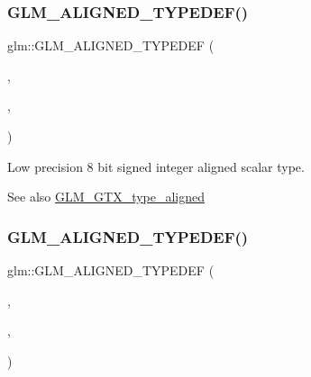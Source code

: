 \subsubsection{\texorpdfstring{G\+L\+M\+\_\+\+A\+L\+I\+G\+N\+E\+D\+\_\+\+T\+Y\+P\+E\+D\+E\+F()}{GLM\_ALIGNED\_TYPEDEF()}\hspace{0.1cm}{\footnotesize\ttfamily [1/209]}}
{\footnotesize\ttfamily glm\+::\+G\+L\+M\+\_\+\+A\+L\+I\+G\+N\+E\+D\+\_\+\+T\+Y\+P\+E\+D\+EF (\begin{DoxyParamCaption}\item[{\hyperlink{group__gtc__type__precision_gaf9e675b6392764242ae87eb179e9d3d6}{lowp\+\_\+int8}}]{,  }\item[{aligned\+\_\+lowp\+\_\+int8}]{,  }\item[{1}]{ }\end{DoxyParamCaption})}

Low precision 8 bit signed integer aligned scalar type. \begin{DoxySeeAlso}{See also}
\hyperlink{group__gtx__type__aligned}{G\+L\+M\+\_\+\+G\+T\+X\+\_\+type\+\_\+aligned} 
\end{DoxySeeAlso}
\mbox{\label{group__gtx__type__aligned_ga5bb5dd895ef625c1b113f2cf400186b0}} 
\subsubsection{\texorpdfstring{G\+L\+M\+\_\+\+A\+L\+I\+G\+N\+E\+D\+\_\+\+T\+Y\+P\+E\+D\+E\+F()}{GLM\_ALIGNED\_TYPEDEF()}\hspace{0.1cm}{\footnotesize\ttfamily [2/209]}}
{\footnotesize\ttfamily glm\+::\+G\+L\+M\+\_\+\+A\+L\+I\+G\+N\+E\+D\+\_\+\+T\+Y\+P\+E\+D\+EF (\begin{DoxyParamCaption}\item[{\hyperlink{group__gtc__type__precision_ga71fc0c399fa4780507748b643733f153}{lowp\+\_\+int16}}]{,  }\item[{aligned\+\_\+lowp\+\_\+int16}]{,  }\item[{2}]{ }\end{DoxyParamCaption})}

